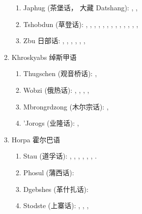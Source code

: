 \documentclass[oldfontcommands,oneside,a4paper,11pt]{article}
\newcommand{\zh}[1]{{\cn #1}}
\newcommand{\langue}[2]{#1}
\begin{document}
\begin{enumerate}
\begin{enumerate}
\item Japhug (\zh{茶堡话， 大藏} Datshang): \citet{linxr93jiarong}, \citet{linluo03}, \citet{lin11direction}
\item Tshobdun (\zh{草登话}):  \citet{jackson94caodeng}, \citet{jackson98morphology}, \citet{jackson00sidaba}, \citet{jackson02rentongdengdi}, \citet{jackson03caodeng}, \citet{jackson04zhuangmaoci}, \citet{jackson05yingao},  \citet{jackson06paisheng}, \citet{jackson06guanxiju}, \citet{jackson07irrealis}, \citet{jacksonlin07}, \citet{sun12complementation}, \citet{sun14generic}, \citet{jackson14morpho}
\item Zbu \zh{日部话}: \citet{linxr93jiarong}, \citet{jackson00puxi}, \citet{jackson00sidaba}, \citet{jackson04showu}, \citet{jacques08}, \citet{gongxun14agreement}, 
\end{enumerate}
\item \langue{Khroskyabs \zh{绰斯甲语}}{Khroskyabs \zh{绰斯甲语}}
\begin{enumerate}
\item Thugschen (\zh{观音桥话}): \citet{huangbf03lavrung}, \citet{huangbf07lavrung}
\item Wobzi (\zh{俄热话}): \citet{linxr93jiarong}, \citet{lai13fuyin}, \citet{lai13affixale}, \citet{lai14caus}, \citet{lai14person}
\item Mbrongrdzong (\zh{木尔宗话}): \citet{jackson00sidaba}, \citet{jackson05yingao}
\item 'Jorogs (\zh{业隆话}):  \citet{yin07yelong}, 
\end{enumerate}
\item \langue{Horpa \zh{霍尔巴语}}{Horpa \zh{霍尔巴语}}
\begin{enumerate} 
\item Stau (\zh{道孚话}): \citet{hodgson57sifan}, \citet{wang70stau}, \citet{sun83liujiang},  \citet{huangbf91daofu}, \citet{sun13gexi}, \citet{antonov14rtau}, \citet{jacques14rtau}.
\item Phosul (\zh{蒲西话}): \citet{jackson00puxi}
\item Dgebshes (\zh{革什扎话}): \citet{duoerji98geshizha}
\item Stodste (\zh{上寨话}): \citet{jackson00sidaba}, \citet{qu07shangzhai}, \citet{jackson07shangzhai},
\end{enumerate}
\end{enumerate}
\end{document}
